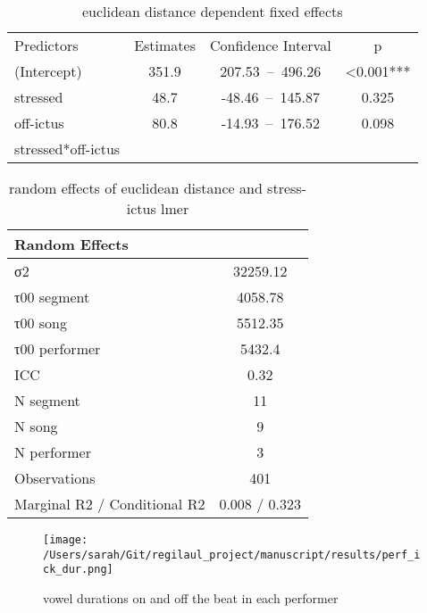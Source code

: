 \begin{table}[htp]
\caption{euclidean distance dependent fixed effects}
\begin{center}
\begin{tabular}{|l|c|c|c|}
\hline							
Predictors	&	Estimates	&	Confidence Interval	&	p	\\
(Intercept)	&	351.9	&	207.53 – 496.26	&	<0.001***	\\
stressed 	&	48.7	&	-48.46 – 145.87	&	0.325	\\
off-ictus	&	80.8	&	-14.93 – 176.52	&	0.098	\\
stressed*off-ictus	&		&		&		\\
\hline							
\end{tabular}
\end{center}
\label{euclmer}
\end{table}%



\begin{table}[htp]
\caption{random effects of euclidean distance and stress-ictus lmer}
\begin{center}
\begin{tabular}{|l|c|}
\hline							
Random Effects	&						\\
\hline
σ2	&	32259.12					\\
τ00 segment	&	4058.78					\\
τ00 song	&	5512.35					\\
τ00 performer	&	5432.4					\\
ICC	&	0.32					\\
\hline
N segment	&	11					\\
N song	&	9					\\
N performer	&	3					\\
Observations	&	401					\\
Marginal R2 / Conditional R2	&	0.008 / 0.323					\\						
\hline							
\hline							
\end{tabular}
\end{center}
\label{randolmereuc}
\end{table}%


\begin{figure}[htb]
\centering
\texttt{[image: /Users/sarah/Git/regilaul\_project/manuscript/results/perf\_ick\_dur.png]}

\caption{vowel durations on and off the beat in each performer}
\label{perfbeats}


\end{figure}

